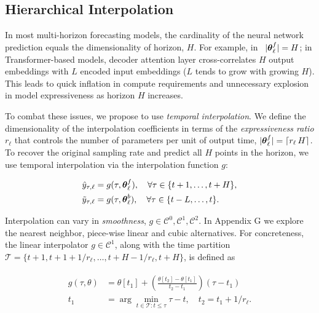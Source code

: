 \subsection{Hierarchical Interpolation}
\label{section:hierarchical_interpolation}

In most multi-horizon forecasting models, the cardinality of the neural network prediction equals the dimensionality of horizon, $H$. For example, in \NBEATSi\ $|\boldsymbol \theta^{f}_{\ell}|= H$; in Transformer-based models, decoder attention layer cross-correlates $H$ output embeddings with $L$ encoded input embeddings ($L$ tends to grow with growing $H$). This leads to quick inflation in compute requirements and unnecessary explosion in model expressiveness as horizon $H$ increases.

To combat these issues, we propose to use \emph{temporal interpolation}. We define the dimensionality of the interpolation coefficients in terms of the \emph{expressiveness ratio} $r_{\ell}$ that controls the number of parameters per unit of output time, $|\boldsymbol \theta^{f}_{\ell}|= \lceil r_{\ell} \, H \rceil$. To recover the original sampling rate and predict all $H$ points in the horizon, we use temporal interpolation via the interpolation function $g$:

\begin{align}
\begin{split}
    \hat{y}_{\tau,\ell}   &= g(\tau, \boldsymbol \theta^{f}_{\ell}), \quad \forall \tau \in \{t+1,\dots,t+H\}, \\
    \tilde{y}_{\tau,\ell} &= g(\tau, \boldsymbol \theta^{b}_{\ell}), \quad \forall \tau \in \{t-L,\dots,t\}. 
\end{split}
\end{align}

Interpolation can vary in \emph{smoothness}, $g \in \mathcal{C}^{0}, \mathcal{C}^{1}, \mathcal{C}^{2}$. In Appendix G we explore the nearest neighbor, piece-wise linear and cubic alternatives. For concreteness, the linear interpolator $g \in \mathcal{C}^{1}$, 
along with the time partition $\mathcal{T} = \{t+1, t+1+1/r_{\ell}, \ldots, t+H-1/r_{\ell}, t+H \}$, is defined as

\begin{align}
\begin{split}
g(\tau, \theta) &= \theta[t_{1}] + \left(\frac{\theta[t_{2}]-\theta[t_{1}]}{t_{2}-t_{1}}\right)(\tau-t_{1}) \\
t_1 &= \arg\min_{t \in \mathcal{T}: t \leq \tau} \tau - t, \quad t_2 = t_1 + 1/r_{\ell}.
\end{split}
\end{align}

